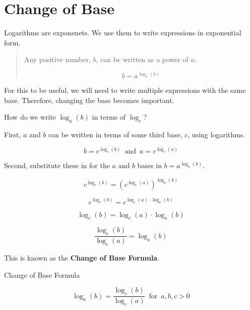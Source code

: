 \documentclass{ximera}
\begin{document}
\section{Change of Base}


Logarithms are exponenets.  We use them to write expressions in exponential form.



\begin{quote}

Any positive number, $b$, can be written as a power of $a$.

\[    b = a^{\log_a(b)}  \]

\end{quote}

For this to be useful, we will need to write multiple expressions with the same base. Therefore, changing the base becomes important.

How do we write $\log_a(b)$ in terms of $\log_c$?




First, $a$ and $b$ can be written in terms of some third base, $c$, using logarithms.


\[    b = c^{\log_c(b)} \,   \text{ and } \,      a = c^{\log_c(a)}      \]



Second, substitute these in for the $a$ and $b$ bases in $b = a^{\log_a(b)}$.



\[   c^{\log_c(b)} = \left(c^{\log_c(a)}\right)^{\log_a(b)}  \]



\[   c^{\log_c(b)} = c^{\log_c(a) \cdot \log_a(b)}  \]



\[   \log_c(b) = \log_c(a) \cdot \log_a(b)  \]


\[   \frac{\log_c(b)}{\log_c(a)} =  \log_a(b)  \]


This is known as the \textbf{Change of Base Formula}.








\begin{template}  Change of Base Formula

\[   \log_a(b)  =  \frac{\log_c(b)}{\log_c(a)}        \, \text{ for } \, a, b, c  > 0        \]


\end{template}
\end{document}
